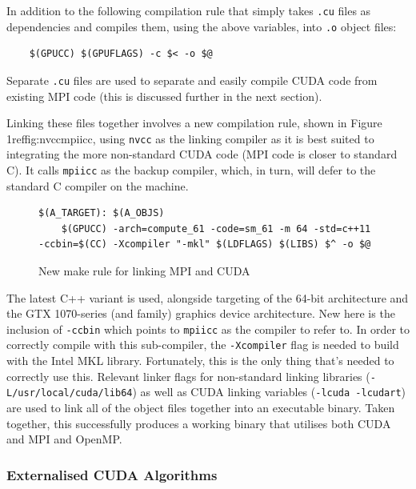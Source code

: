 \documentclass[conference]{IEEEtran}
\begin{document}
In addition to the following compilation rule that simply takes \texttt{.cu} files as dependencies and compiles them, using the above variables, into \texttt{.o} object files:

\begin{lstlisting}[breaklines]
%.o: %.cu
    $(GPUCC) $(GPUFLAGS) -c $< -o $@
\end{lstlisting}

Separate \texttt{.cu} files are used to separate and easily compile CUDA code from existing MPI code (this is discussed further in the next section).

Linking these files together involves a new compilation rule, shown in Figure 1ref{fig:nvccmpiicc}, using \texttt{nvcc} as the linking compiler as it is best suited to integrating the more non-standard CUDA code (MPI code is closer to standard C). It calls \texttt{mpiicc} as the backup compiler, which, in turn, will defer to the standard C compiler on the machine.

\begin{figure}[!h]
    \centering
    \begin{lstlisting}[breaklines]
$(A_TARGET): $(A_OBJS)
    $(GPUCC) -arch=compute_61 -code=sm_61 -m 64 -std=c++11 -ccbin=$(CC) -Xcompiler "-mkl" $(LDFLAGS) $(LIBS) $^ -o $@
    \end{lstlisting}
    \caption{New make rule for linking MPI and CUDA}
    \label{fig:nvccmpiicc}
\end{figure}

The latest C++ variant is used, alongside targeting of the 64-bit architecture and the GTX 1070-series (and family) graphics device architecture. New here is the inclusion of \texttt{-ccbin} which points to \texttt{mpiicc} as the compiler to refer to. In order to correctly compile with this sub-compiler, the \texttt{-Xcompiler} flag is needed to build with the Intel MKL library. Fortunately, this is the only thing that's needed to correctly use this. Relevant linker flags for non-standard linking libraries (\texttt{-L/usr/local/cuda/lib64}) as well as CUDA linking variables (\texttt{-lcuda -lcudart}) are used to link all of the object files together into an executable binary. Taken together, this successfully produces a working binary that utilises both CUDA and MPI and OpenMP.

\subsubsection{Externalised CUDA Algorithms}
\end{document}
